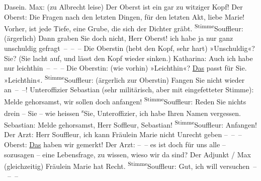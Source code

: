 \begin{ledgroupsized}[t]{13cm}
					Dasein.\pend
           \pstart
           Max: (zu Albrecht leise) Der Oberst ist ein gar zu witziger Kopf!\pend
           \pstart
           Der Oberst: Die  Fragen nach den letzten
					Dingen, für den letzten Akt, liebe Marie! Vorher, ist jede Tiefe, eine Grube,
					die sich der Dichter gräbt.\pend
           \pstart
           \substVorne{}\textsuperscript{Stimme}{\allowbreak}\substDazwischen{}Souffleur\substHinten{}: (ärgerlich) Dann graben Sie doch nicht, Herr Oberst!\pend
           \pstart
           \label{T_L01900-1v}\label{T_L01900-1h} ich
					habe ja nur ganz unschuldig gefragt – – –\pend
           \pstart
           Die Oberstin (hebt den Kopf, sehr hart) \introOben{}»\introOben{}Unschuldig\introOben{}«\introOben{}? Sie? (Sie lacht auf, und lässt den Kopf wieder
					sinken.)\pend
           \pstart
           Katharina: Auch ich habe nur leichthin – – –\pend
           \pstart
           Die Oberstin: (wie vorhin) »Leichthin«? \uline{Das} passt
					für Sie. »Leichthin«.\pend
           \pstart
           \substVorne{}\textsuperscript{Stimme}{\allowbreak}\substDazwischen{}Souffleur\substHinten{}: (ärgerlich zur Oberstin) Fangen Sie nicht wieder an – –!\pend
           \pstart
           Unteroffizier Sebastian (sehr militärisch, aber mit eingefetteter Stimme): Melde
					gehorsamst, wir sollen doch anfangen!\pend
           \pstart
           \substVorne{}\textsuperscript{Stimme}{\allowbreak}\substDazwischen{}Souffleur\substHinten{}: Reden Sie nichts drein – Sie – wie heissen \substVorne{}\textsuperscript{s}\substDazwischen{}S\substHinten{}ie, Unteroffizier, ich habe Ihren Namen vergessen.\pend
           \pstart
           {\pb}Sebastian: Melde gehorsamst,
					Herr Soffleur, Sebastian!\pend
           \pstart
           \substVorne{}\textsuperscript{Stimme}{\allowbreak}\substDazwischen{}Souffleur\substHinten{}: Anfangen!\pend
           \pstart
           Der Arzt: Herr Souffleur, ich kann Fräulein Marie nicht Unrecht geben
					– – –\pend
           \pstart
           Oberst: \uline{Das} haben wir gemerkt!\pend
           \pstart
           Der Arzt: – – es ist doch für uns alle – sozusagen – eine Lebensfrage, zu
					wissen, wieso wir da sind?\pend
           \pstart
           Der Adjunkt / Max (gleichzeitig) Fräulein Marie hat Recht.\pend
           \pstart
           \substVorne{}\textsuperscript{Stimme}{\allowbreak}\substDazwischen{}Souffleur\substHinten{}: Gut, ich will versuchen – – –\pend
           \pstart

\end{ledgroupsized}
